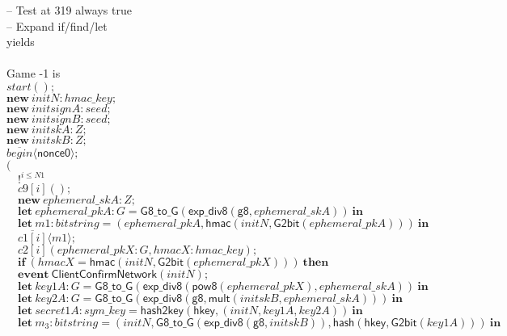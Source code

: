 \documentclass{article}
\newcommand{\cinput}[2]{{#1}({#2})}
\newcommand{\coutput}[2]{\overline{#1}\langle{#2}\rangle}
\newcommand{\kw}[1]{\mathbf{#1}}
\newcommand{\kwf}[1]{\mathsf{#1}}
\newcommand{\var}[1]{\mathit{#1}}
\newcommand{\kwt}[1]{\mathit{#1}}
\newcommand{\kwp}[1]{\mathit{#1}}
\newcommand{\kwc}[1]{\mathit{#1}}
\begin{document}
\begin{tabbing}
\qquad -- Test at 319 always true\\
\quad -- Expand if/find/let\\
yields\\
\\
Game -1 is\\
\>$\cinput{\kwc{start}}{};$\\
\>$\kw{new}\ \var{initN}: \kwt{hmac{\_}key};$\\
\>$\kw{new}\ \var{initsignA}: \kwt{seed};$\\
\>$\kw{new}\ \var{initsignB}: \kwt{seed};$\\
\>$\kw{new}\ \var{initskA}: \kwt{Z};$\\
\>$\kw{new}\ \var{initskB}: \kwt{Z};$\\
\>$\coutput{\kwc{begin}}{\kwf{nonce0}};$\\
\>$($\\
\>$\quad !^{\var{i} \leq \kwp{N1}}$\\
\>$\quad \cinput{\kwc{c9}[\var{i}]}{};$\\
\>$\quad \kw{new}\ \var{ephemeral{\_}skA}: \kwt{Z};$\\
\>$\quad \kw{let}\ \var{ephemeral{\_}pkA}: \kwt{G} = \kwf{G8{\_}to{\_}G}(\kwf{exp{\_}div8}(\kwf{g8}, \var{ephemeral{\_}skA}))\ \kw{in}$\\
\>$\quad \kw{let}\ \var{m1}: \kwt{bitstring} = \kwf{}(\var{ephemeral{\_}pkA}, \kwf{hmac}(\var{initN}, \kwf{G2bit}(\var{ephemeral{\_}pkA})))\ \kw{in}$\\
\>$\quad \coutput{\kwc{c1}[\var{i}]}{\var{m1}};$\\
\>$\quad \cinput{\kwc{c2}[\var{i}]}{\var{ephemeral{\_}pkX}: \kwt{G}, \var{hmacX}: \kwt{hmac{\_}key}};$\\
\>$\quad \kw{if}\ (\var{hmacX}  =  \kwf{hmac}(\var{initN}, \kwf{G2bit}(\var{ephemeral{\_}pkX})))\ \kw{then}$\\
\>$\quad \kw{event}\ \kwf{ClientConfirmNetwork}(\var{initN});$\\
\>$\quad \kw{let}\ \var{key1A}: \kwt{G} = \kwf{G8{\_}to{\_}G}(\kwf{exp{\_}div8}(\kwf{pow8}(\var{ephemeral{\_}pkX}), \var{ephemeral{\_}skA}))\ \kw{in}$\\
\>$\quad \kw{let}\ \var{key2A}: \kwt{G} = \kwf{G8{\_}to{\_}G}(\kwf{exp{\_}div8}(\kwf{g8}, \kwf{mult}(\var{initskB}, \var{ephemeral{\_}skA})))\ \kw{in}$\\
\>$\quad \kw{let}\ \var{secret1A}: \kwt{sym{\_}key} = \kwf{hash2key}(\kwf{hkey}, \kwf{}(\var{initN}, \var{key1A}, \var{key2A}))\ \kw{in}$\\
\>$\quad \kw{let}\ \var{m}_{3}: \kwt{bitstring} = \kwf{}(\var{initN}, \kwf{G8{\_}to{\_}G}(\kwf{exp{\_}div8}(\kwf{g8}, \var{initskB})), \kwf{hash}(\kwf{hkey}, \kwf{G2bit}(\var{key1A})))\ \kw{in}$\\

\end{tabbing}
\end{document}
